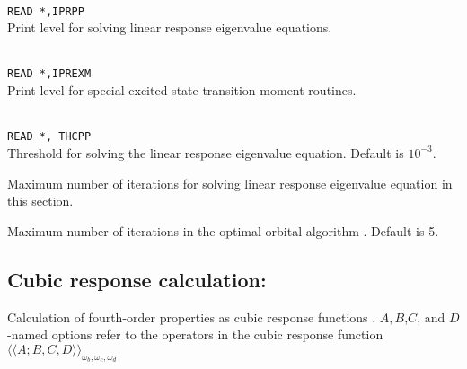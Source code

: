 \begin{description}
\item{}\\
\verb|READ *,IPRPP|\\
Print level for solving linear response eigenvalue equations.

\item{}\\
\verb|READ *,IPREXM|\\
Print level for special excited state transition moment routines.


\item{}\\
\verb|READ *, THCPP|\\
Threshold for solving the linear response
eigenvalue equation. Default is $10^{-3}$.

\item{}
Maximum number of iterations for solving linear response
eigenvalue equation in this section.

\item{}
Maximum number of iterations in the optimal
orbital algorithm 
\cite{tuhjahjajpjjcp84}. 
Default is 5.

\end{description}


\subsection{Cubic response calculation: }
Calculation of fourth-order properties as cubic response functions
\cite{pndjovhacpl242,djpnhajcp105,pndjhapdkrthhkcpl253}.
$A,B$,$C$, and $D$-named options refer to the operators in the cubic
response function 
$\langle\!\langle A;B,C,D \rangle\!\rangle_{\omega_b,\omega_c,\omega_d}$

